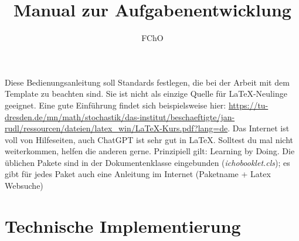 \documentclass[../main.tex]{subfiles}
\title{Manual zur Aufgabenentwicklung}
\author{FChO}
\begin{document}
\maketitle
Diese Bedienungsanleitung soll Standards festlegen, die bei der Arbeit mit dem Template zu beachten sind. Sie ist nicht als einzige Quelle f\"ur \LaTeX-Neulinge geeignet. Eine gute Einf\"uhrung findet sich beispielsweise hier: \url{https://tu-dresden.de/mn/math/stochastik/das-institut/beschaeftigte/jan-rudl/ressourcen/dateien/latex_win/LaTeX-Kurs.pdf?lang=de}. Das Internet ist voll von Hilfeseiten, auch ChatGPT ist sehr gut in \LaTeX. Solltest du mal nicht weiterkommen, helfen die anderen gerne. Prinzipiell gilt: Learning by Doing. Die \"ublichen Pakete sind in der Dokumentenklasse eingebunden (\textit{ichobooklet.cls}); es gibt f\"ur jedes Paket auch eine Anleitung im Internet (Paketname + Latex Websuche)
\tableofcontents
\pagebreak

\section{Technische Implementierung}
\end{document}
